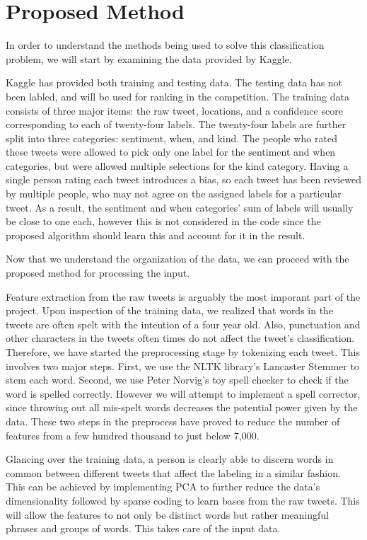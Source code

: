 \documentclass{article}
\begin{document}
\section{Proposed Method}
In order to understand the methods being used to solve this classification problem, we will start by examining the data provided by Kaggle.

Kaggle has provided both training and testing data. The testing data has not been labled, and will be used for ranking in the competition. The training data consists of three major items: the raw tweet, locations, and a confidence score corresponding to each of twenty-four labels. The twenty-four labels are further split into three categories: sentiment, when, and kind. The people who rated these tweets were allowed to pick only one label for the sentiment and when categories, but were allowed multiple selections for the kind category. Having a single person rating each tweet introduces a bias, so each tweet has been reviewed by multiple people, who may not agree on the assigned labels for a particular tweet. As a result, the sentiment and when categories' sum of labels will usually be close to one each, however this is not considered in the code since the proposed algorithm should learn this and account for it in the result.

Now that we understand the organization of the data, we can proceed with the proposed method for processing the input.

Feature extraction from the raw tweets is arguably the most imporant part of the project. Upon inspection of the training data, we realized that words in the tweets are often spelt with the intention of a four year old. Also, punctuation and other characters in the tweets often times do not affect the tweet's classification. Therefore, we have started the preprocessing stage by tokenizing each tweet. This involves two major steps. First, we use the NLTK library's Lancaster Stemmer to stem each word. Second, we use Peter Norvig's toy spell checker to check if the word is spelled correctly. However we will attempt to implement a spell corrector, since throwing out all mis-spelt words decreases the potential power given by the data. These two steps in the preprocess have proved to reduce the number of features from a few hundred thousand to just below 7,000.

Glancing over the training data, a person is clearly able to discern words in common between different tweets that affect the labeling in a similar fashion. This can be achieved by implementing PCA to further reduce the data's dimensionality followed by sparse coding to learn bases from the raw tweets. This will allow the features to not only be distinct words but rather meaningful phrases and groups of words. This takes care of the input data.
\end{document}
